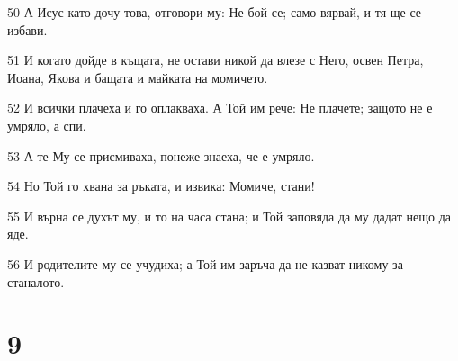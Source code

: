 \par 50 А Исус като дочу това, отговори му: Не бой се; само вярвай, и тя ще се избави.
\par 51 И когато дойде в къщата, не остави никой да влезе с Него, освен Петра, Иоана, Якова и бащата и майката на момичето.
\par 52 И всички плачеха и го оплакваха. А Той им рече: Не плачете; защото не е умряло, а спи.
\par 53 А те Му се присмиваха, понеже знаеха, че е умряло.
\par 54 Но Той го хвана за ръката, и извика: Момиче, стани!
\par 55 И върна се духът му, и то на часа стана; и Той заповяда да му дадат нещо да яде.
\par 56 И родителите му се учудиха; а Той им заръча да не казват никому за станалото.

\chapter{9}

